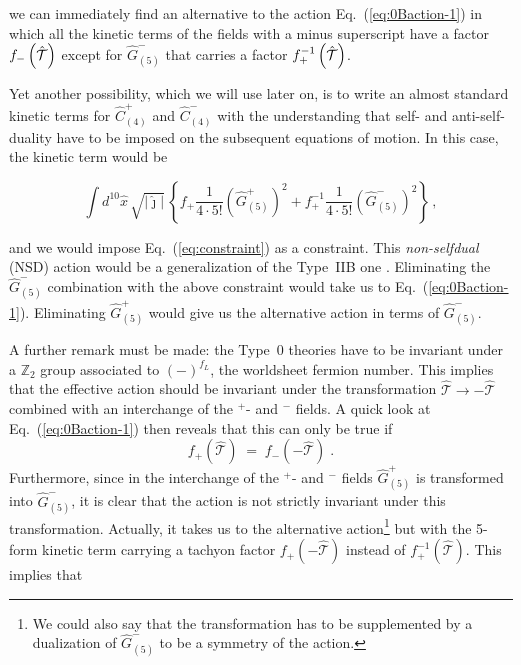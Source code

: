 \documentclass[12pt,a4paper]{article}
\begin{document}
\noindent we can immediately find an alternative to the action
Eq.~(\ref{eq:0Baction-1}) in which all the kinetic terms of the fields
with a minus superscript have a factor $f_{-}\left(\hat{\cal
    T}\right)$ except for $\hat{G}^{-}_{(5)}$ that carries a factor
$f_{+}^{-1}\left(\hat{\cal T}\right)$.

Yet another possibility, which we will use later on, is to write an
almost standard kinetic terms for $\hat{C}^{+}_{(4)}$ and
$\hat{C}^{-}_{(4)}$ with the understanding that self- and
anti-self-duality have to be imposed on the subsequent equations of
motion. In this case, the kinetic term would be

\begin{equation}
\label{eq:NSDkineticterms}
\int d^{10}\hat{x}\, \sqrt{|\hat{\jmath}|}\, 
\left\{f_{+}{\textstyle\frac{1}{4\cdot 5!}}
\left(\hat{G}^{+}_{(5)}\right)^{2}
+f_{+}^{-1}{\textstyle\frac{1}{4\cdot 5!}}
\left(\hat{G}^{-}_{(5)}\right)^{2}\right\}\, ,
\end{equation}

\noindent and we would impose Eq.~(\ref{eq:constraint}) as a constraint.
This {\em non-selfdual} (NSD) action would be a generalization of the
Type~IIB one \cite{kn:BBO,kn:MO}. Eliminating the $\hat{G}^{-}_{(5)}$
combination with the above constraint would take us to
Eq.~(\ref{eq:0Baction-1}). Eliminating $\hat{G}^{+}_{(5)}$ would give
us the  alternative action in terms of $\hat{G}^{-}_{(5)}$.


A further remark must be made: the Type~0 theories have to be
invariant under a $\mathbb{Z}_{2}$ group associated to $(-)^{f_{L}}$,
the worldsheet fermion number.  This implies that the effective action
should be invariant under the transformation
$\hat{\mathcal{T}}\rightarrow -\hat{\mathcal{T}}$ combined with an
interchange of the $^{+}$- and $^{-}$ fields.  A quick look at
Eq.~(\ref{eq:0Baction-1}) then reveals that this can only be true if
\begin{equation}
  \label{eq:relatie1}
  f_{+}\left(\hat{\mathcal{T}}\right) \;=\;
        f_{-}\left( -\hat{\mathcal{T}}\right) \; .
\end{equation}
Furthermore, since in the interchange of the $^{+}$- and $^{-}$ fields
$\hat{G}^{+}_{(5)}$ is transformed into $\hat{G}^{-}_{(5)}$, it is
clear that the action is not strictly invariant under this
transformation. Actually, it takes us to the alternative
action\footnote{We could also say that the transformation has to be
  supplemented by a dualization of $\hat{G}^{-}_{(5)}$ to be a
  symmetry of the action.} but with the 5-form kinetic term carrying a
tachyon factor $f_{+}\left(-\hat{\mathcal{T}}\right)$ instead of 
$f_{+}^{-1}\left(\hat{\mathcal{T}}\right)$. This implies that 
\end{document}
